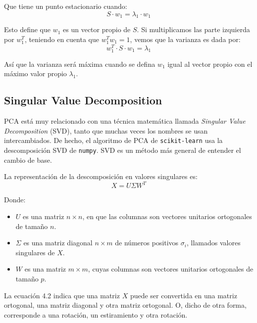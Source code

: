 \documentclass[11pt,spanish,listoffigures,listoftables]{tfgetsinf}
\begin{document}
   Que tiene un punto estacionario cuando:
   \begin{equation}
   S\cdot w_{1} = \lambda_{1} \cdot w_{1}
   \end{equation}
   
   Esto define que \(w_{1}\) es un vector propio de \(S\). Si multiplicamos las parte izquierda por \(w_{1}^{T}\), teniendo en cuenta que \(w_{1}^{T}w_{1}=1\), vemos que la varianza es dada por:
   \begin{equation}
   w_{1}^{T}\cdot S\cdot w_{1} = \lambda_{1} 
   \end{equation}
   
   Así que la varianza será máxima cuando se defina \(w_{1}\) igual al vector propio con el máximo valor propio \(\lambda_{1}\).
   
    \subsection{Singular Value Decomposition}
    PCA está muy relacionado con una técnica matemática llamada {\em Singular Value Decomposition} (SVD), tanto que muchas veces los nombres se usan intercambiados. De hecho, el algoritmo de PCA de {\tt scikit-learn} usa la descomposición SVD de {\tt numpy}. SVD es un método más general de entender el cambio de base.
    
    La representación de la descomposición en valores singulares es:
    \begin{equation}
    X = U \Sigma W^{T}
    \end{equation}
    
    Donde:
    \begin{itemize}
    \item \(U\) es una matriz \(n \times n\), en que las columnas son vectores unitarios ortogonales de tamaño \(n\).
    \item \(\Sigma\) es una matriz diagonal \(n \times m\) de números positivos \(\sigma_{i}\), llamados valores singulares de \(X\).
    \item \(W\) es una matriz \(m \times m\), cuyas columnas son vectores unitarios ortogonales de tamaño \(p\).
    \end{itemize}
    
    La ecuación 4.2 indica que una matriz \(X\) puede ser convertida en una matriz ortogonal, una matriz diagonal y otra matriz ortogonal. O, dicho de otra forma, corresponde a una rotación, un estiramiento y otra rotación.
    
\end{document}
